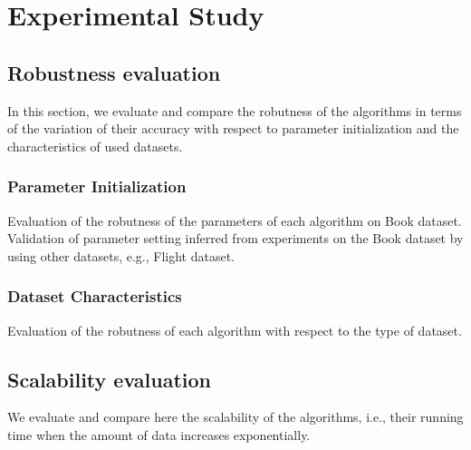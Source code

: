 \section{Experimental Study}

\subsection{Robustness evaluation}
In this section, we evaluate and compare the robutness of the algorithms
in terms of the variation of their accuracy with respect to parameter initialization
and the characteristics of used datasets.

\subsubsection{Parameter Initialization}
Evaluation of the robutness of the parameters of each algorithm on Book dataset.
Validation of parameter setting inferred from experiments on the Book
dataset by using other datasets, e.g., Flight dataset. 

\subsubsection{Dataset Characteristics}
Evaluation of the robutness of each algorithm with respect to the type of dataset.

\subsection{Scalability evaluation}
We evaluate and compare here the scalability of the algorithms, i.e., their
running time when the amount of data increases exponentially.


